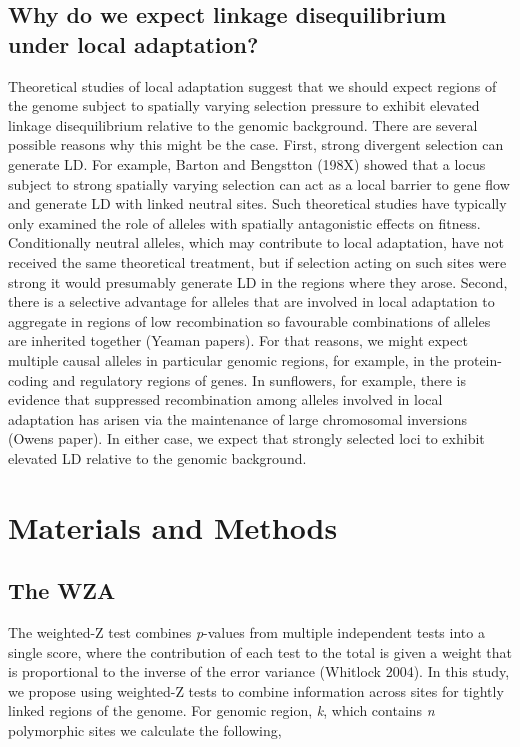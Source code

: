\documentclass[11pt,twoside,lineno]{GSA_format}
\begin{document}
\subsection{Why do we expect linkage disequilibrium under local adaptation?}

Theoretical studies of local adaptation suggest that we should expect regions of the genome subject to spatially varying selection pressure to exhibit elevated linkage disequilibrium relative to the genomic background. There are several possible reasons why this might be the case. First, strong divergent selection can generate LD. For example, Barton and Bengstton (198X) showed that a locus subject to strong spatially varying selection can act as a local barrier to gene flow and generate LD with linked neutral sites. Such theoretical studies have typically only examined the role of alleles with spatially antagonistic effects on fitness. Conditionally neutral alleles, which may contribute to local adaptation, have not received the same theoretical treatment, but if selection acting on such sites were strong it would presumably generate LD in the regions where they arose. Second, there is a selective advantage for alleles that are involved in local adaptation to aggregate in regions of low recombination so favourable combinations of alleles are inherited together (Yeaman papers). For that reasons, we might expect multiple causal alleles in particular genomic regions, for example, in the protein-coding and regulatory regions of genes. In sunflowers, for example, there is evidence that suppressed recombination among alleles involved in local adaptation has arisen via the maintenance of large chromosomal inversions (Owens paper). In either case, we expect that strongly selected loci to exhibit elevated LD relative to the genomic background.

\section{Materials and Methods}
\label{sec:materials:methods}

\subsection{The WZA} 

The weighted-Z test combines \textit{p}-values from multiple independent tests into a single score, where the contribution of each test to the total is given a weight that is proportional to the inverse of the error variance (Whitlock 2004). In this study, we propose using weighted-Z tests to combine information across sites for tightly linked regions of the genome. For genomic region, \textit{k}, which contains \textit{n} polymorphic sites we calculate the following,
\end{document}

